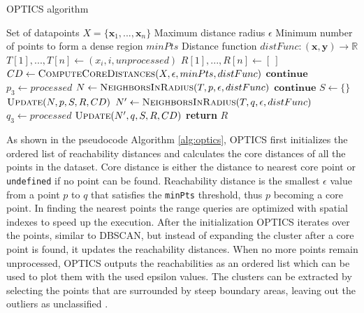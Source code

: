 \begin{algorithm}
\caption{OPTICS algorithm \cite{optics-1999}}\label{alg:optics}
\begin{algorithmic}[1]
\Require Set of datapoints $X=\{\mathbf{x}_1, ..., \mathbf{x}_n\}$
\Require Maximum distance radius $\epsilon$
\Require Minimum number of points to form a dense region $minPts$
\Require Distance function $distFunc: (\mathbf{x}, \mathbf{y}) \xrightarrow{} \mathbb{R}$
  \State $T[1], ..., T[n] \gets (x_i, i, unprocessed)$ 
  \State $R[1], ..., R[n] \gets [\:]$ 
  \State $CD \gets \Call{ComputeCoreDistances}{X, \epsilon, minPts, distFunc}$
      \State $\mathbf{continue}$
    \EndIf
    \State $p_3 \gets processed$
    \State $N \gets \Call{NeighborsInRadius}{T, p, \epsilon, distFunc}$
      \State $\mathbf{continue}$ 
    \EndIf
    \State $S \gets \{\}$ 
    \State $\Call{Update}{N, p, S, R, CD}$
      \State $N' \gets \Call{NeighborsInRadius}{T, q, \epsilon, distFunc}$
      \State $q_3 \gets processed$
        \State $\Call{Update}{N', q, S, R, CD}$
      \EndIf
    \EndFor
  \EndFor
  \State \textbf{return} $R$
\EndProcedure
\end{algorithmic}
\end{algorithm}

As shown in the pseudocode Algorithm \ref{alg:optics}, OPTICS first initializes the ordered list of reachability distances and calculates the core distances of all the points in the dataset. Core distance is either the distance to nearest core point or \texttt{undefined} if no point can be found. Reachability distance is the smallest $\epsilon$ value from a point $p$ to $q$ that satisfies the \texttt{minPts} threshold, thus $p$ becoming a core point. In finding the nearest points the range queries are optimized with spatial indexes to speed up the execution. After the initialization OPTICS iterates over the points, similar to DBSCAN, but instead of expanding the cluster after a core point is found, it updates the reachability distances. When no more points remain unprocessed, OPTICS outputs the reachabilities as an ordered list which can be used to plot them with the used epsilon values. The clusters can be extracted by selecting the points that are surrounded by steep boundary areas, leaving out the outliers as unclassified \cite{data-mining-2011}.

